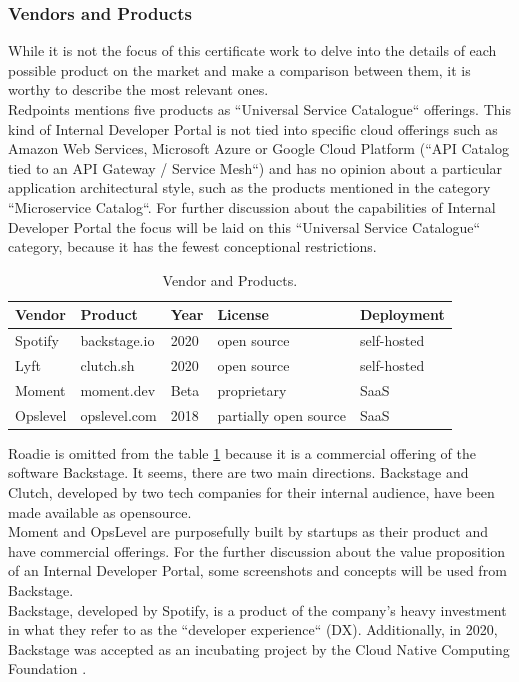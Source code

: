 \documentclass[a4paper,10pt]{article}
\begin{document}
    \subsubsection{Vendors and Products}
    \label{sssec:vendors}
    While it is not the focus of this certificate work to delve into the details of each possible product on the market
    and make a comparison between them, it is worthy to describe the most relevant ones.\\
    Redpoints mentions five products as ``Universal Service Catalogue`` offerings\parencite{devportalsprimer}.
    This kind of Internal Developer Portal is not tied into specific cloud offerings such as Amazon Web Services, Microsoft Azure or Google
    Cloud Platform (``API Catalog tied to an API Gateway / Service Mesh``) and has no opinion about a particular application
    architectural style, such as the products mentioned in the category ``Microservice Catalog``.
    For further discussion about the capabilities of Internal Developer Portal the focus will be laid on this
    ``Universal Service Catalogue`` category, because it has the fewest conceptional restrictions.\\
    \begin{table}[!htbp]
        \begin{center}
            \begin{tabularx}{\textwidth}{XXXlX}
                \toprule
                Vendor   & Product      & Year & License               & Deployment  \\
                \midrule
                Spotify  & backstage.io & 2020 & open source           & self-hosted \\
                Lyft     & clutch.sh    & 2020 & open source           & self-hosted \\
                Moment   & moment.dev   & Beta & proprietary           & SaaS        \\
                Opslevel & opslevel.com & 2018 & partially open source & SaaS        \\
                \bottomrule
            \end{tabularx}
            \caption{\label{tab:vendors} Vendor and Products.}
        \end{center}
    \end{table}
    \FloatBarrier
    Roadie is omitted from the table \ref{tab:vendors} because it is a commercial offering of the software Backstage.
    It seems, there are two main directions.
    Backstage and Clutch, developed by two tech companies for their internal audience, have been made
    available as opensource.\\
    Moment and OpsLevel are purposefully built by startups as their product and have commercial offerings.
    For the further discussion about the value proposition of an Internal Developer Portal, some screenshots and concepts will
    be used from Backstage.\\
    Backstage, developed by Spotify, is a product of the company's heavy investment in what they refer to as the
    ``developer experience`` (DX)\parencite{spotifydx}.
    Additionally, in 2020, Backstage was accepted as an incubating project by the Cloud Native Computing Foundation\parencite{cncf} .
\end{document}
